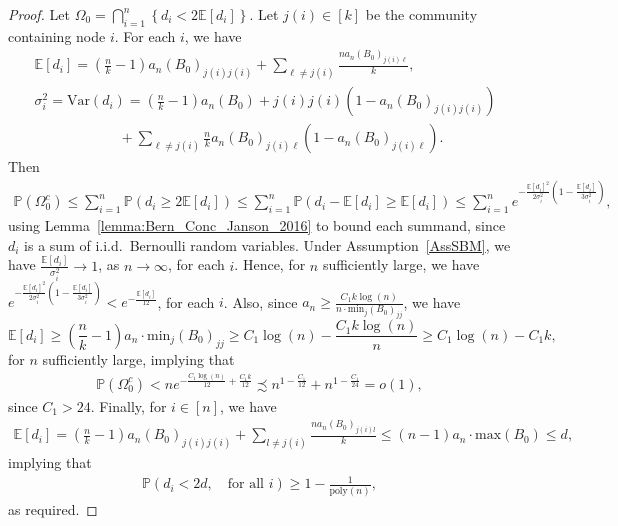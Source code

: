 \documentclass{article}
\newcommand{\mprob}{\mathbb{P}}
\begin{document}
\begin{proof}
Let $\Omega_0 = \bigcap_{i = 1}^n\left\{d_i < 2\mathbb{E}[d_i]\right\}$. Let $j(i) \in [k]$ be the community containing node $i$. For each $i$, we have
\begin{align*}
&\mathbb{E}[d_i] = \left(\frac{n}{k} - 1\right)a_n (B_0)_{j(i)j(i)} + \sum_{\ell \neq j(i)}\frac{na_n (B_0)_{j(i)\ell}}{k},\\
&\sigma_i^2 = \text{Var}(d_i) = \left(\frac{n}{k} - 1\right)a_n (B_0)+{j(i)j(i)}(1 - a_n (B_0)_{j(i)j(i)}) \\
%
& \qquad \qquad \qquad + \sum_{\ell \neq j(i)}\frac{n}{k}a_n (B_0)_{j(i)\ell}(1 - a_n (B_0)_{j(i)\ell}).
\end{align*}
Then
\begin{align*}
\mathbb{P}(\Omega_0^c) \leq \sum_{i = 1}^n\mathbb{P}(d_i \geq 2\mathbb{E}[d_i]) \leq \sum_{i = 1}^n\mathbb{P}(d_i - \mathbb{E}[d_i] \geq \mathbb{E}[d_i]) \le \sum_{i=1}^n e^{-\frac{\mathbb{E}[d_i]^2}{2\sigma_i^2}\left(1 - \frac{\mathbb{E}[d_i]}{3\sigma_i^2}\right)},
\end{align*}
using Lemma~\ref{lemma:Bern_Conc_Janson_2016} to bound each summand, since $d_i$ is a sum of i.i.d.\ Bernoulli random variables.
Under Assumption~\ref{AssSBM}, we have $\frac{\mathbb{E}[d_i]}{\sigma_i^2} \rightarrow 1$, as $n \rightarrow \infty$, for each $i$. Hence, for $n$ sufficiently large, we have
$e^{-\frac{\mathbb{E}[d_i]^2}{2\sigma_i^2}\left(1 - \frac{\mathbb{E}[d_i]}{3\sigma_i^2}\right)} < e^{-\frac{\mathbb{E}[d_i]}{12}}$, for each $i$. Also, since $a_n \geq \frac{C_1k\log(n)}{n\cdot \text{min}_{j}{(B_0)_{jj}}}$, we have
\begin{equation*}
\mathbb{E}[d_i] \geq \left(\frac{n}{k} - 1\right)a_n \cdot\text{min}_{j}{(B_0)_{jj}} \geq C_1\log(n) - \frac{C_1k\log(n)}{n} \geq C_1\log(n) - C_1k,
\end{equation*}
for $n$ sufficiently large, implying that 
\begin{align*}
\mathbb{P}(\Omega_0^c) < ne^{-\frac{C_1\log(n)}{12} + \frac{C_1k}{12}} \precsim n^{1 - \frac{C_1}{12}} + n^{1 - \frac{C_1}{24}} = o(1),
\end{align*}
since $C_1 > 24$. Finally, for $i \in [n]$, we have 
\begin{align*}
\mathbb{E}[d_i] = \left(\frac{n}{k} - 1\right)a_n (B_0)_{j(i)j(i)} + \sum_{l \neq j(i)}\frac{na_n (B_0)_{j(i)l}}{k} \leq (n - 1)a_n \cdot\text{max}(B_0) \leq d,
\end{align*}
implying that 
\begin{align*}
\mprob\left(d_i < 2d, \quad \text{for all } i\right) \geq 1 - \frac{1}{\mathrm{poly}(n)},
\end{align*}
as required.
\end{proof}
\end{document}
